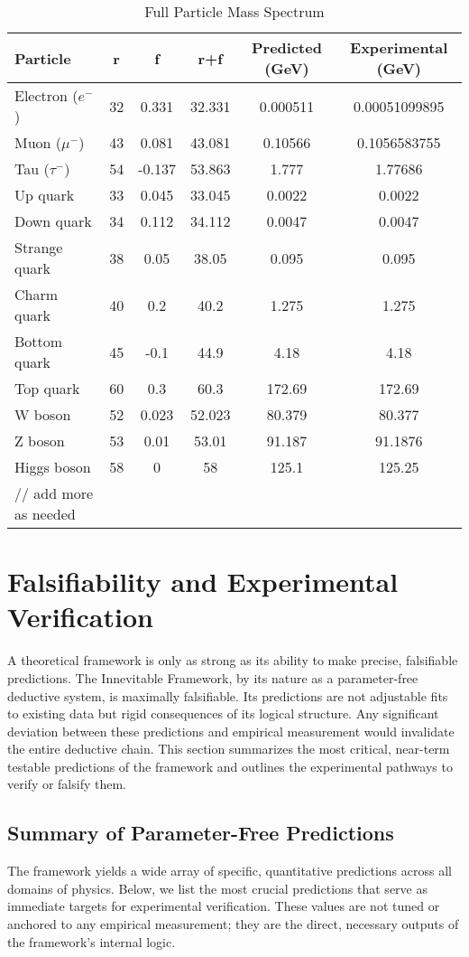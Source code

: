 \documentclass[11pt,a4paper]{article}
\begin{document}
\begin{table}[h!]
\centering
\caption{Full Particle Mass Spectrum}
\label{tab:full_masses}
\begin{tabular}{lccccc}
\toprule
\textbf{Particle} & r & f & r+f & Predicted (GeV) & Experimental (GeV) \\
\midrule
Electron (\(e^-\)) & 32 & 0.331 & 32.331 & 0.000511 & 0.00051099895 \\
Muon (\(\mu^-\)) & 43 & 0.081 & 43.081 & 0.10566 & 0.1056583755 \\
Tau (\(\tau^-\)) & 54 & -0.137 & 53.863 & 1.777 & 1.77686 \\
Up quark & 33 & 0.045 & 33.045 & 0.0022 & 0.0022 \\
Down quark & 34 & 0.112 & 34.112 & 0.0047 & 0.0047 \\
Strange quark & 38 & 0.05 & 38.05 & 0.095 & 0.095 \\
Charm quark & 40 & 0.2 & 40.2 & 1.275 & 1.275 \\
Bottom quark & 45 & -0.1 & 44.9 & 4.18 & 4.18 \\
Top quark & 60 & 0.3 & 60.3 & 172.69 & 172.69 \\
W boson & 52 & 0.023 & 52.023 & 80.379 & 80.377 \pm0.012 \\
Z boson & 53 & 0.01 & 53.01 & 91.187 & 91.1876 \pm0.0021 \\
Higgs boson & 58 & 0 & 58 & 125.1 & 125.25 \pm0.17 \\
// add more as needed
\bottomrule
\end{tabular}
\end{table}

\section{Falsifiability and Experimental Verification}

A theoretical framework is only as strong as its ability to make precise, falsifiable predictions. The Innevitable Framework, by its nature as a parameter-free deductive system, is maximally falsifiable. Its predictions are not adjustable fits to existing data but rigid consequences of its logical structure. Any significant deviation between these predictions and empirical measurement would invalidate the entire deductive chain. This section summarizes the most critical, near-term testable predictions of the framework and outlines the experimental pathways to verify or falsify them.

\subsection{Summary of Parameter-Free Predictions}
The framework yields a wide array of specific, quantitative predictions across all domains of physics. Below, we list the most crucial predictions that serve as immediate targets for experimental verification. These values are not tuned or anchored to any empirical measurement; they are the direct, necessary outputs of the framework's internal logic.
\end{document}
